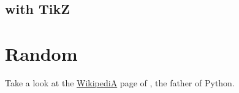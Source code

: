 \documentclass{article}
\begin{document}

	\subsection{with TikZ} %
	\label{sub:with_tikz}
		


\section{Random} %
\label{sec:random}

	Take a look at the \href{https://en.wikipedia.org/wiki/Linus_Torvalds}{WikipediA} page of \citet{Python}, the father of Python.





\end{document}
